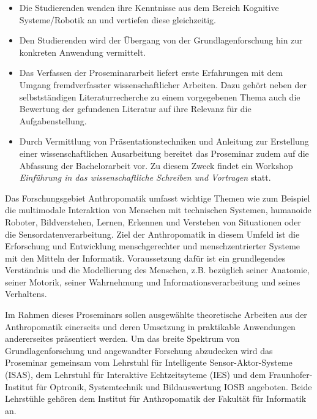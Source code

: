 \begin{course}
\begin{learningoutcomes}
\begin{itemize}\item Die Studierenden wenden ihre Kenntnisse aus dem Bereich Kognitive Systeme/Robotik an und vertiefen diese gleichzeitig.  \item Den Studierenden wird der Übergang von der Grundlagenforschung hin zur konkreten Anwendung vermittelt.  \item Das Verfassen der Proseminararbeit liefert erste Erfahrungen mit dem Umgang fremdverfasster wissenschaftlicher Arbeiten. Dazu gehört neben der selbstständigen Literaturrecherche zu einem vorgegebenen Thema auch die Bewertung der gefundenen Literatur auf ihre Relevanz für die Aufgabenstellung.  \item Durch Vermittlung von Präsentationstechniken und Anleitung zur Erstellung einer wissenschaftlichen Ausarbeitung bereitet das Proseminar zudem auf die Abfassung der Bachelorarbeit vor. Zu diesem Zweck findet ein Workshop \emph{Einführung in das wissenschaftliche Schreiben und Vortragen} statt.  \end{itemize}
\end{learningoutcomes}

\begin{content}
Das Forschungsgebiet Anthropomatik umfasst wichtige Themen wie zum Beispiel die multimodale Interaktion von Menschen mit technischen Systemen, humanoide Roboter, Bildverstehen, Lernen, Erkennen und Verstehen von Situationen oder die Sensordatenverarbeitung. Ziel der Anthropomatik in diesem Umfeld ist die Erforschung und Entwicklung menschgerechter und menschzentrierter Systeme mit den Mitteln der Informatik. Voraussetzung dafür ist ein grundlegendes Verständnis und die Modellierung des Menschen, z.B. bezüglich seiner Anatomie, seiner Motorik, seiner Wahrnehmung und Informationsverarbeitung und seines Verhaltens.

 

Im Rahmen dieses Proseminars sollen ausgewählte theoretische Arbeiten aus der Anthropomatik einerseits und deren Umsetzung in praktikable Anwendungen andererseites präsentiert werden. Um das breite Spektrum von Grundlagenforschung und angewandter Forschung abzudecken wird das Proseminar gemeinsam vom Lehrstuhl für Intelligente Sensor-Aktor-Systeme (ISAS), dem Lehrstuhl für Interaktive Echtzeitsyteme (IES) und dem Fraunhofer-Institut für Optronik, Systemtechnik und Bildauswertung IOSB angeboten. Beide Lehrstühle gehören dem Institut für Anthropomatik der Fakultät für Informatik an.


\end{content}







\end{course}